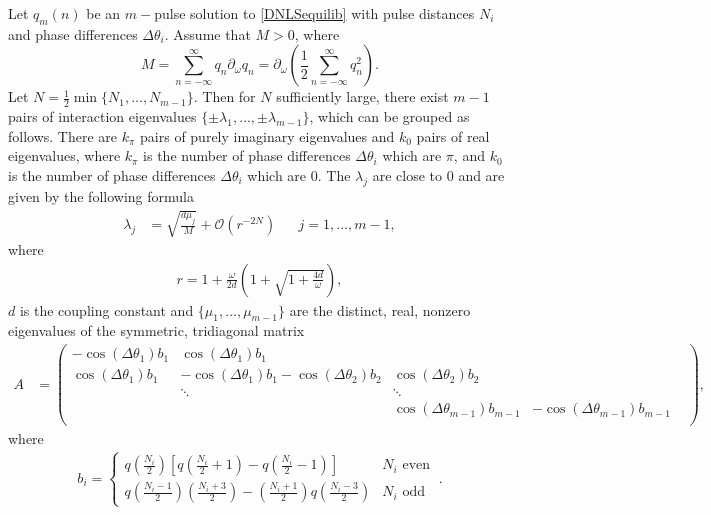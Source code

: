 \documentclass[thesis.tex]{subfiles}
\begin{document}
\begin{theorem}\label{DNLSeigtheorem}
Let $q_m(n)$ be an $m-$pulse solution to \cref{DNLSequilib} with pulse distances $N_i$ and phase differences $\Delta\theta_i$. Assume that $M > 0$, where
\[
M = \sum_{n=-\infty}^\infty q_n \partial_\omega q_n = \partial_\omega \left( \frac{1}{2} \sum_{n=-\infty}^\infty q_n^2 \right).
\]
Let $N = \frac{1}{2} \min\{ N_1, \dots, N_{m-1}\}$. Then for $N$ sufficiently large, there exist $m-1$ pairs of interaction eigenvalues $\{\pm \lambda_1, \dots, \pm \lambda_{m-1}\}$, which can be grouped as follows. There are $k_\pi$ pairs of purely imaginary eigenvalues and $k_0$ pairs of real eigenvalues, where $k_\pi$ is the number of phase differences $\Delta\theta_i$ which are $\pi$, and $k_0$ is the number of phase differences $\Delta\theta_i$ which are $0$. The $\lambda_j$ are close to 0 and are given by the following formula
\begin{align}\label{eigsDNLS}
\lambda_j &= \sqrt{\frac{d \mu_j}{M}} + \mathcal{O}(r^{-2N}) && j = 1, \dots, m-1,
\end{align}
where
\begin{align}\label{eigr}
r = 1 + \frac{\omega}{2 d} \left( 1 + \sqrt{1 + \frac{4 d}{\omega}} \right),
\end{align}
$d$ is the coupling constant and $\{ \mu_1, \dots, \mu_{m-1} \}$ are the distinct, real, nonzero eigenvalues of the symmetric, tridiagonal matrix
\begin{align}\label{DNLSmatrixA}
A &= \begin{pmatrix}
-\cos(\Delta\theta_1) b_1 & \cos(\Delta\theta_1) b_1 & & &  \\
\cos(\Delta\theta_1) b_1 & -\cos(\Delta\theta_1) b_1 - \cos(\Delta\theta_2) b_2 & \cos(\Delta\theta_2) b_2 \\
& \ddots & \ddots \\
& &  \cos(\Delta\theta_{m-1}) b_{m-1} & -\cos(\Delta\theta_{m-1}) b_{m-1}  \\
\end{pmatrix},
\end{align}
where
\begin{align}\label{bieq}
b_i = \begin{cases}
q\left(\frac{N_i}{2}\right) \left[ q\left(\frac{N_i}{2} + 1\right) - q\left(\frac{N_i}{2} - 1\right) \right] & N_i \text{ even} \\
q\left(\frac{N_i-1}{2}\right)\left(\frac{N_i+3}{2}\right) 
- \left(\frac{N_i+1}{2}\right)q\left(\frac{N_i-3}{2}\right) & N_i \text{ odd}
\end{cases} \:.
\end{align}
\end{theorem}
\end{document}
